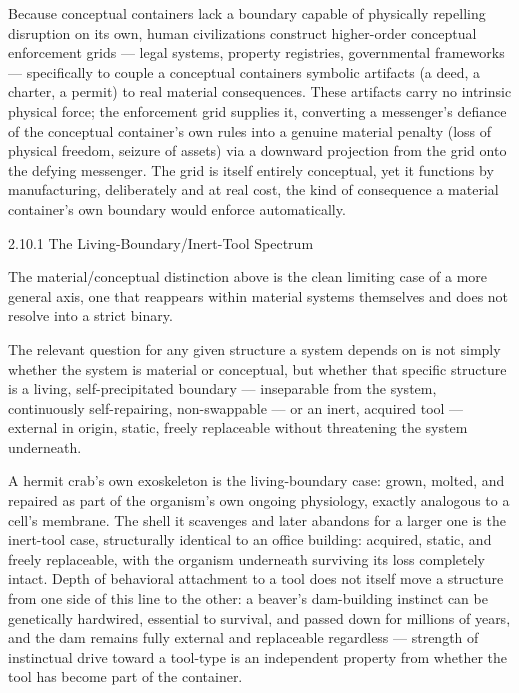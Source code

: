 \documentclass[
]{article}
\begin{document}
Because conceptual containers lack a boundary capable of physically
repelling disruption on its own, human civilizations construct
higher-order conceptual enforcement grids --- legal systems, property
registries, governmental frameworks --- specifically to couple a
conceptual containers symbolic artifacts (a deed, a charter, a permit)
to real material consequences. These artifacts carry no intrinsic
physical force; the enforcement grid supplies it, converting a
messenger's defiance of the conceptual container's own rules into a
genuine material penalty (loss of physical freedom, seizure of assets)
via a downward projection from the grid onto the defying messenger. The
grid is itself entirely conceptual, yet it functions by manufacturing,
deliberately and at real cost, the kind of consequence a material
container's own boundary would enforce automatically.

2.10.1 The Living-Boundary/Inert-Tool Spectrum

The material/conceptual distinction above is the clean limiting case of
a more general axis, one that reappears within material systems
themselves and does not resolve into a strict binary.

The relevant question for any given structure a system depends on is not
simply whether the system is material or conceptual, but whether that
specific structure is a living, self-precipitated boundary ---
inseparable from the system, continuously self-repairing, non-swappable
--- or an inert, acquired tool --- external in origin, static, freely
replaceable without threatening the system underneath.

A hermit crab's own exoskeleton is the living-boundary case: grown,
molted, and repaired as part of the organism's own ongoing physiology,
exactly analogous to a cell's membrane. The shell it scavenges and later
abandons for a larger one is the inert-tool case, structurally identical
to an office building: acquired, static, and freely replaceable, with
the organism underneath surviving its loss completely intact. Depth of
behavioral attachment to a tool does not itself move a structure from
one side of this line to the other: a beaver's dam-building instinct can
be genetically hardwired, essential to survival, and passed down for
millions of years, and the dam remains fully external and replaceable
regardless --- strength of instinctual drive toward a tool-type is an
independent property from whether the tool has become part of the
container.
\end{document}
